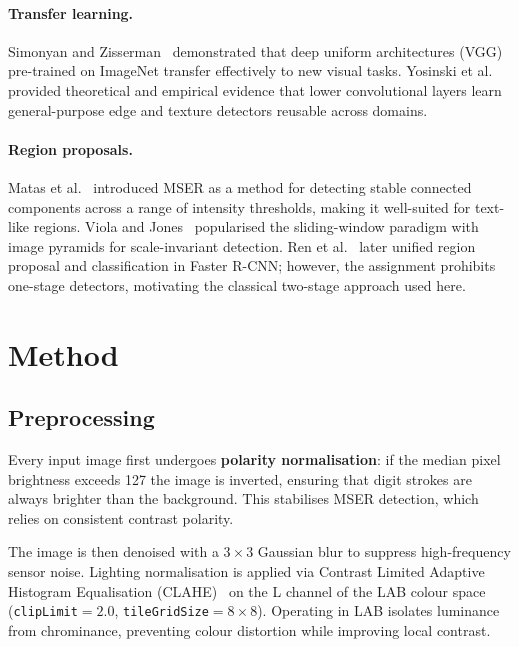 \documentclass[10pt,twocolumn]{article}
\begin{document}
\paragraph{Transfer learning.}
Simonyan and Zisserman~\cite{simonyan2015vgg} demonstrated that deep
uniform architectures (VGG) pre-trained on ImageNet transfer effectively
to new visual tasks.
Yosinski et al.~\cite{yosinski2014transferable} provided theoretical and
empirical evidence that lower convolutional layers learn general-purpose
edge and texture detectors reusable across domains.

\paragraph{Region proposals.}
Matas et al.~\cite{matas2004robust} introduced MSER as a method for
detecting stable connected components across a range of intensity
thresholds, making it well-suited for text-like regions.
Viola and Jones~\cite{viola2004robust} popularised the sliding-window
paradigm with image pyramids for scale-invariant detection.
Ren et al.~\cite{ren2015fasterrcnn} later unified region proposal and
classification in Faster R-CNN; however, the assignment prohibits
one-stage detectors, motivating the classical two-stage approach used here.

\section{Method}

\subsection{Preprocessing}

Every input image first undergoes \textbf{polarity normalisation}: if the
median pixel brightness exceeds 127 the image is inverted, ensuring that
digit strokes are always brighter than the background.
This stabilises MSER detection, which relies on consistent contrast polarity.

The image is then denoised with a $3\times3$ Gaussian blur to suppress
high-frequency sensor noise.
Lighting normalisation is applied via Contrast Limited Adaptive Histogram
Equalisation (CLAHE)~\cite{zuiderveld1994clahe} on the L channel of the
LAB colour space (\texttt{clipLimit}$=2.0$,
\texttt{tileGridSize}$=8\times8$).
Operating in LAB isolates luminance from chrominance, preventing colour
distortion while improving local contrast.
\end{document}
